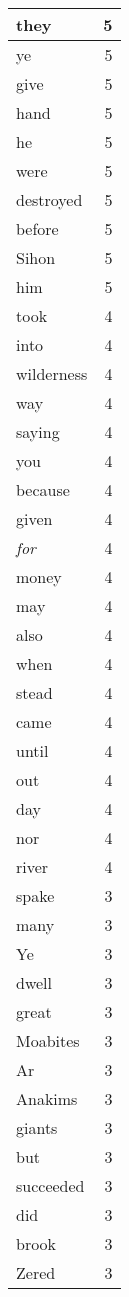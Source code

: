 \begin{center}
\begin{longtable}{l|r}
they & 5 \\ \hline
ye & 5 \\ \hline
give & 5 \\ \hline
hand & 5 \\ \hline
he & 5 \\ \hline
were & 5 \\ \hline
destroyed & 5 \\ \hline
before & 5 \\ \hline
Sihon & 5 \\ \hline
him & 5 \\ \hline
took & 4 \\ \hline
into & 4 \\ \hline
wilderness & 4 \\ \hline
way & 4 \\ \hline
saying & 4 \\ \hline
you & 4 \\ \hline
because & 4 \\ \hline
given & 4 \\ \hline
\emph{for} & 4 \\ \hline
money & 4 \\ \hline
may & 4 \\ \hline
also & 4 \\ \hline
when & 4 \\ \hline
stead & 4 \\ \hline
came & 4 \\ \hline
until & 4 \\ \hline
out & 4 \\ \hline
day & 4 \\ \hline
nor & 4 \\ \hline
river & 4 \\ \hline
spake & 3 \\ \hline
many & 3 \\ \hline
Ye & 3 \\ \hline
dwell & 3 \\ \hline
great & 3 \\ \hline
Moabites & 3 \\ \hline
Ar & 3 \\ \hline
Anakims & 3 \\ \hline
giants & 3 \\ \hline
but & 3 \\ \hline
succeeded & 3 \\ \hline
did & 3 \\ \hline
brook & 3 \\ \hline
Zered & 3 \\ \hline

\end{longtable}
\end{center}
